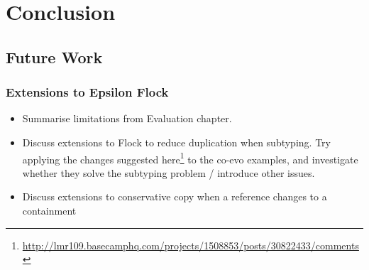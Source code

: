 
\chapter{Conclusion}

\section{Future Work}
\label{sec:future_work}

\subsection{Extensions to Epsilon Flock}
\begin{itemize}
	\item Summarise limitations from Evaluation chapter.
	\item Discuss extensions to Flock to reduce duplication when subtyping.
	\subitem Try applying the changes suggested here\footnote{\url{http://lmr109.basecamphq.com/projects/1508853/posts/30822433/comments}} to the co-evo examples, and investigate whether they solve the subtyping problem / introduce other issues. 
	\item Discuss extensions to conservative copy when a reference changes to a containment
\end{itemize}